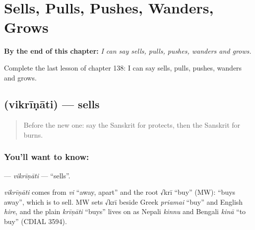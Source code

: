 
\chapter{Sells, Pulls, Pushes, Wanders, Grows}
\label{ch:sa-sells-pulls-pushes-wanders-grows}

\begin{chapteropening}
\textbf{By the end of this chapter:} \emph{I can say sells, pulls, pushes, wanders and grows.}

Complete the last lesson of chapter 138: I can say sells, pulls, pushes, wanders and grows.
\end{chapteropening}

\section[\texorpdfstring{\sk{विक्रीणाति} (vikrīṇāti)}{विक्रीणाति (vikrīṇāti)}]{ (vikrīṇāti) — sells}

\label{lesson:SA-C138-vikrinati}



\begin{quote}
Before the new one: say the Sanskrit for protects, then the Sanskrit for burns.
\end{quote}

\subsection*{You'll want to know: }
\textbf{} — \emph{vikrīṇāti} — \textquotedblleft{}sells\textquotedblright{}.

\begin{cousinweb}
\emph{vikrīṇāti} comes from \emph{vi} \textquotedblleft{}away, apart\textquotedblright{} and the root √krī \textquotedblleft{}buy\textquotedblright{} (MW): \textquotedblleft{}buys away\textquotedblright{}, which is to sell. MW sets √krī beside Greek \emph{priamai} \textquotedblleft{}buy\textquotedblright{} and English \emph{hire}, and the plain \emph{krīṇāti} \textquotedblleft{}buys\textquotedblright{} lives on as Nepali \emph{kinnu} and Bengali \emph{kinā} \textquotedblleft{}to buy\textquotedblright{} (CDIAL 3594).
\end{cousinweb}

